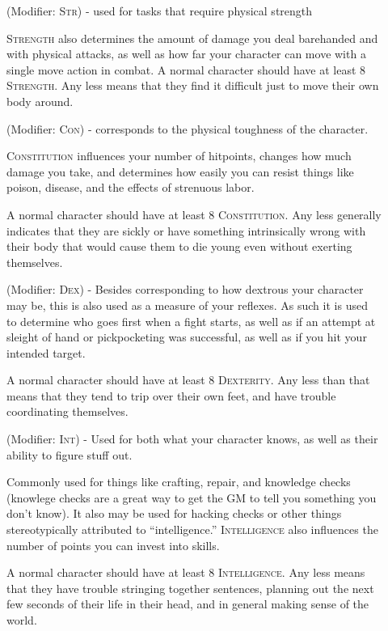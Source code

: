 \begin{description}
\item[] (Modifier: \textsc{Str}) - used for tasks that require physical strength

\textsc{Strength} also determines the amount of damage you deal barehanded and with physical attacks, as well as how far your character can move with a single move action in combat. A normal character should have at least 8 \textsc{Strength}. Any less means that they find it difficult just to move their own body around.

\item[] (Modifier: \textsc{Con}) - corresponds to the physical toughness of the character.

\textsc{Constitution} influences your number of hitpoints, changes how much damage you take, and determines how easily you can resist things like poison, disease, and the effects of strenuous labor.

A normal character should have at least 8 \textsc{Constitution}. Any less generally indicates that they are sickly or have something intrinsically wrong with their body that would cause them to die young even without exerting themselves.

\item[] (Modifier: \textsc{Dex}) - Besides corresponding to how dextrous your character may be, this is also used as a measure of your reflexes. As such it is used to determine who goes first when a fight starts, as well as if an attempt at sleight of hand or pickpocketing was successful, as well as if you hit your intended target.

A normal character should have at least 8 \textsc{Dexterity}. Any less than that means that they tend to trip over their own feet, and have trouble coordinating themselves.

\item [] (Modifier: \textsc{Int}) - Used for both what your character knows, as well as their ability to figure stuff out.

Commonly used for things like crafting, repair, and knowledge checks (knowlege checks are a great way to get the GM to tell you something you don't know). It also may be used for hacking checks or other things stereotypically attributed to “intelligence.” \textsc{Intelligence} also influences the number of points you can invest into skills.

A normal character should have at least 8 \textsc{Intelligence}. Any less means that they have trouble stringing together sentences, planning out the next few seconds of their life in their head, and in general making sense of the world.


\end{description}
